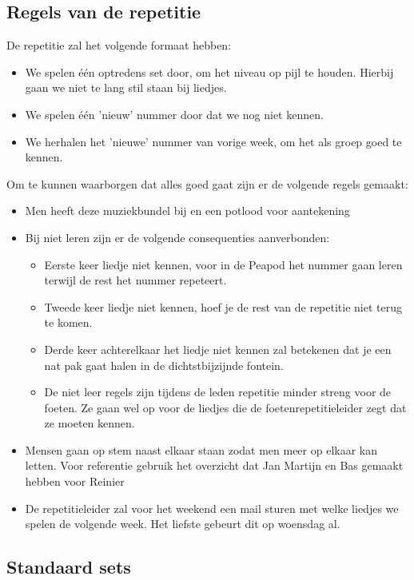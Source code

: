 \subsection*{Regels van de repetitie}
\footnotesize
 De repetitie zal het volgende formaat hebben:
\begin{itemize}
\item We spelen één optredens set door, om het niveau op pijl te houden. Hierbij gaan we niet te lang stil staan bij liedjes.
\item We spelen één 'nieuw' nummer door dat we nog niet kennen.
\item We herhalen het 'nieuwe' nummer van vorige week, om het als groep goed te kennen.
\end{itemize}

Om te kunnen waarborgen dat alles goed gaat zijn er de volgende regels gemaakt:
\begin{itemize}
\item Men heeft deze muziekbundel bij en een potlood voor aantekening
\item Bij niet leren zijn er de volgende consequenties aanverbonden:
\begin{itemize}
    \item Eerste keer liedje niet kennen, voor in de Peapod het nummer gaan leren terwijl de rest het nummer repeteert.
    \item Tweede keer liedje niet kennen, hoef je de rest van de repetitie niet terug te komen.
    \item Derde keer achterelkaar het liedje niet kennen zal betekenen dat je een nat pak gaat halen in de dichtstbijzijnde fontein.
    \item De niet leer regels zijn tijdens de leden repetitie minder streng voor de foeten. Ze gaan wel op voor de liedjes die de foetenrepetitieleider zegt dat ze moeten kennen.
\end{itemize}
\item Mensen gaan op stem naast elkaar staan zodat men meer op elkaar kan letten. Voor referentie gebruik het overzicht dat Jan Martijn en Bas gemaakt hebben voor Reinier
\item De repetitieleider zal voor het weekend een mail sturen met welke liedjes we spelen de volgende week. Het liefste gebeurt dit op woensdag al.
\end{itemize}
\vfill
\subsection*{Standaard sets}
\begin{framed}
	\begin{minipage}[b][105mm][c]{148mm}%
		\hfill\vspace{105mm}%
	\end{minipage}%
\end{framed}
\normalsize
